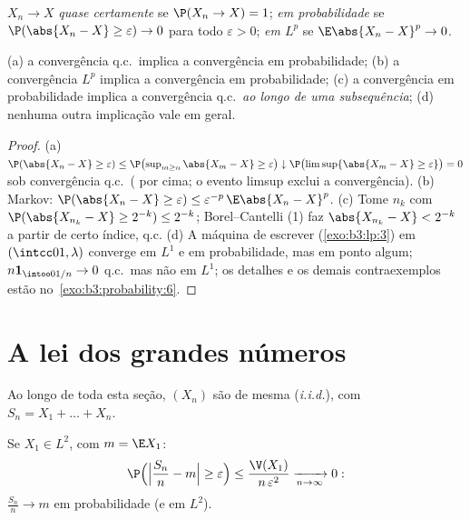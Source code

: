 \begin{definition}\label{def:b3:probability:modes}
$X_n \to X$ \emph{quase certamente} se $\P(X_n \to X) = 1$; \emph{em probabilidade} se $\P(\abs{X_n - X} \geq \varepsilon)
\to 0$
para todo $\varepsilon > 0$; \emph{em $L^p$} se $\E\abs{X_n - X}^p \to 0$.
\end{definition}

\begin{proposition}\label{prop:b3:probability:modes}
(a) a convergência q.c.\ implica a convergência em probabilidade;
(b) a convergência $L^p$ implica a convergência em probabilidade;
(c) a convergência em probabilidade implica a convergência q.c.\
\emph{ao longo de uma subsequência};
(d) nenhuma outra implicação vale em geral.
\end{proposition}

\begin{proof}
(a) $\P(\abs{X_n - X} \geq \varepsilon) \leq
\P\bigl(\sup_{m\geq n}\abs{X_m - X} \geq \varepsilon\bigr)
\downarrow \P\bigl(\limsup\{\abs{X_m - X} \geq
\varepsilon\}\bigr) = 0$ sob convergência q.c.\ ( por cima; o evento
limsup exclui a convergência). (b) Markov: $\P(\abs{X_n - X} \geq \varepsilon) \leq
\varepsilon^{-p}\,\E\abs{X_n - X}^p$. (c) Tome $n_k$ com
$\P(\abs{X_{n_k} - X} \geq 2^{-k}) \leq 2^{-k}$; Borel--Cantelli (1) faz $\abs{X_{n_k} - X} < 2^{-k}$ a partir de certo índice, q.c. (d) A
máquina de escrever (\cref{exo:b3:lp:3}) em $(\intcc01, \lambda)$ converge em $L^1$ e em
probabilidade, mas em ponto algum; $n\mathbf 1_{\intoo0{1/n}} \to 0$ q.c.\ mas não em $L^1$; os
detalhes e os demais contraexemplos estão no~\cref{exo:b3:probability:6}.
\end{proof}

\section{A lei dos grandes números}

Ao longo de toda esta seção, $(X_n)$ são  de mesma 
(\emph{i.i.d.}), com $S_n = X_1 + \dots + X_n$.

\begin{theorem}
\label{thm:b3:probability:wlln}
Se $X_1 \in L^2$, com $m = \E X_1$:
\[
\P\Bigl(\Bigl|\frac{S_n}{n} - m\Bigr| \geq
\varepsilon\Bigr) \leq
\frac{\V(X_1)}{n\,\varepsilon^2}
\xrightarrow[n\to\infty]{} 0 :
\]
$\frac{S_n}n \to m$ em probabilidade (e em $L^2$).\index{lei dos grandes números
(fraca)}
\end{theorem}

